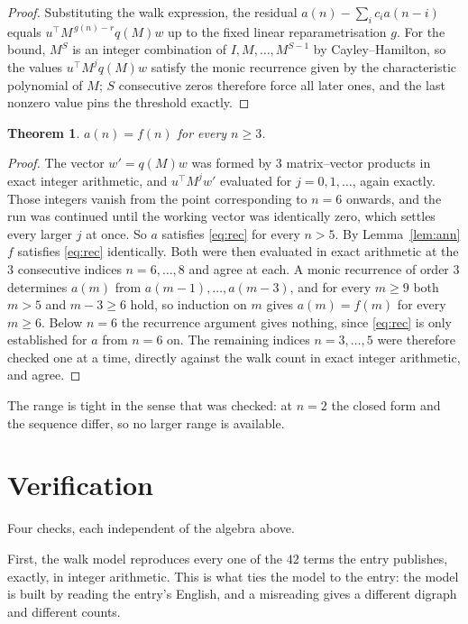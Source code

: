 \documentclass[11pt,a4paper]{article}
\theoremstyle{plain}
\newtheorem{theorem}{Theorem}
\theoremstyle{definition}
\begin{document}
\begin{proof}
Substituting the walk expression, the residual $a(n)-\sum_ic_ia(n-i)$ equals
$u^{\!\top}M^{\,g(n)-r}q(M)w$ up to the fixed linear reparametrisation $g$. For the bound,
$M^{S}$ is an integer combination of $I,M,\dots,M^{S-1}$ by Cayley--Hamilton, so the values
$u^{\!\top}M^{j}q(M)w$ satisfy the monic recurrence given by the characteristic polynomial of
$M$; $S$ consecutive zeros therefore force all later ones, and the last nonzero value pins the
threshold exactly.
\end{proof}

\begin{theorem}
$a(n)=f(n)$ for every $n\ge3$.
\end{theorem}

\begin{proof}
The vector $w'=q(M)w$ was formed by $3$ matrix--vector products in exact integer
arithmetic, and $u^{\!\top}M^{j}w'$ evaluated for $j=0,1,\dots$, again exactly. Those integers
vanish from the point corresponding to $n=6$ onwards, and the run was continued until the
working vector was identically zero, which settles every larger $j$ at once. So $a$ satisfies
\eqref{eq:rec} for every $n>5$. By Lemma~\ref{lem:ann} $f$ satisfies \eqref{eq:rec}
identically. Both were then evaluated in exact arithmetic at the $3$ consecutive indices
$n=6,\dots,8$ and agree at each. A monic recurrence of order $3$
determines $a(m)$ from $a(m-1),\dots,a(m-3)$, and for every $m\ge9$ both
$m>5$ and $m-3\ge6$ hold, so induction on $m$ gives $a(m)=f(m)$ for every
$m\ge6$.
Below $n=6$ the recurrence argument gives nothing, since \eqref{eq:rec} is only
established for $a$ from $n=6$ on. The remaining indices $n=3,\dots,5$ were
therefore checked one at a time, directly against the walk count in exact integer arithmetic,
and agree.
\end{proof}

The range is tight in the sense that was checked: at $n=2$ the closed form and the sequence differ, so no larger range is available.

\section{Verification}

Four checks, each independent of the algebra above.

First, the walk model reproduces every one of the $42$ terms the entry publishes,
exactly, in integer arithmetic. This is what ties the model to the entry: the model is built
by reading the entry's English, and a misreading gives a different digraph and different
counts.
\end{document}

